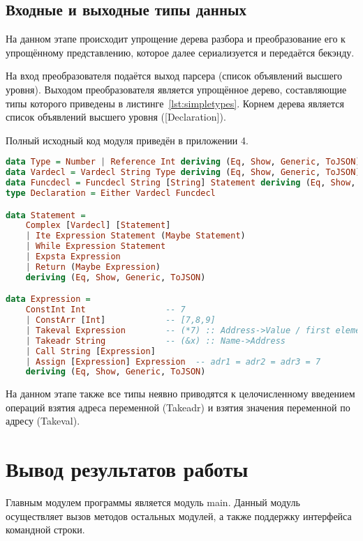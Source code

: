 \documentclass[a4paper,12pt]{report}
\numberwithin{equation}{section}
\begin{document}
\subsection{Входные и выходные типы данных}
На данном этапе происходит упрощение дерева разбора и преобразование его к упрощённому представлению, которое далее сериализуется и передаётся бекэнду.

На вход преобразователя подаётся выход парсера (список объявлений высшего уровня).
Выходом преобразователя является упрощённое дерево, составляющие типы которого приведены в листинге~\ref{lst:simpletypes}. Корнем дерева является список объявлений высшего уровня ([Declaration]).

Полный исходный код модуля приведён в приложении 4.

\begin{lstlisting}[language=haskell,caption={Выходные типы упрощённого дерева},label=lst:simpletypes]
data Type = Number | Reference Int deriving (Eq, Show, Generic, ToJSON)
data Vardecl = Vardecl String Type deriving (Eq, Show, Generic, ToJSON)
data Funcdecl = Funcdecl String [String] Statement deriving (Eq, Show, Generic, ToJSON)
type Declaration = Either Vardecl Funcdecl

data Statement =
    Complex [Vardecl] [Statement]
    | Ite Expression Statement (Maybe Statement)
    | While Expression Statement
    | Expsta Expression
    | Return (Maybe Expression)
    deriving (Eq, Show, Generic, ToJSON)

data Expression =
    ConstInt Int                -- 7
    | ConstArr [Int]            -- [7,8,9]
    | Takeval Expression        -- (*7) :: Address->Value / first element of array
    | Takeadr String            -- (&x) :: Name->Address
    | Call String [Expression]  
    | Assign [Expression] Expression  -- adr1 = adr2 = adr3 = 7
    deriving (Eq, Show, Generic, ToJSON)
\end{lstlisting}

На данном этапе также все типы неявно приводятся к целочисленному введением операций взятия адреса переменной (Takeadr) и взятия значения переменной по адресу (Takeval).

\section{Вывод результатов работы}
Главным модулем программы является модуль main. 
Данный модуль осуществляет вызов методов остальных модулей, а также поддержку интерфейса командной строки.
\end{document}

